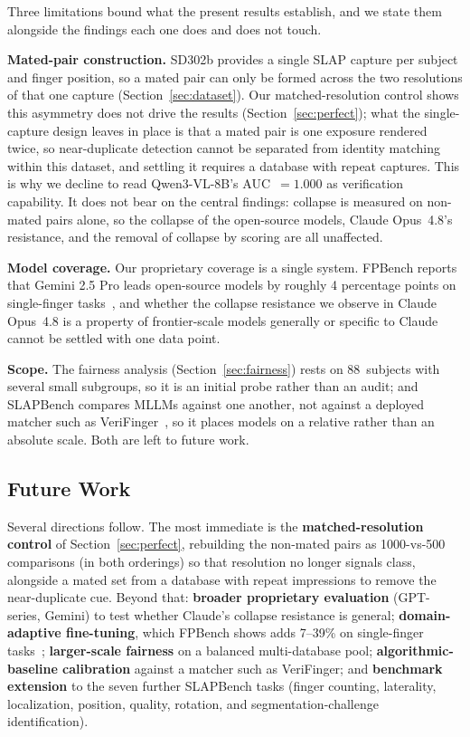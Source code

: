 \documentclass[runningheads]{llncs}
\begin{document}
Three limitations bound what the present results establish, and we state
them alongside the findings each one does and does not touch.

\textbf{Mated-pair construction.}
SD302b provides a single SLAP capture per subject and finger position, so a
mated pair can only be formed across the two resolutions of that one capture
(Section~\ref{sec:dataset}). Our matched-resolution control shows this
asymmetry does not drive the results (Section~\ref{sec:perfect}); what the
single-capture design leaves in place is that a mated pair is one exposure
rendered twice, so near-duplicate detection cannot be separated from identity
matching within this dataset, and settling it requires a database with repeat
captures. This is why we decline to read Qwen3-VL-8B's AUC~$= 1.000$ as
verification capability. It does not bear on the central findings: collapse is
measured on non-mated pairs alone, so the collapse of the open-source models,
Claude Opus~4.8's resistance, and the removal of collapse by scoring are all
unaffected.

\textbf{Model coverage.}
Our proprietary coverage is a single system. FPBench reports that Gemini
2.5 Pro leads open-source models by roughly 4 percentage points on
single-finger tasks~\cite{fpbench2025}, and whether the collapse resistance
we observe in Claude Opus~4.8 is a property of frontier-scale models
generally or specific to Claude cannot be settled with one data point.

\textbf{Scope.} The fairness analysis (Section~\ref{sec:fairness}) rests on
88~subjects with several small subgroups, so it is an initial probe rather than
an audit; and SLAPBench compares MLLMs against one another, not against a
deployed matcher such as VeriFinger~\cite{verifinger}, so it places models on a
relative rather than an absolute scale. Both are left to future work.

\subsection{Future Work}

Several directions follow. The most immediate is the
\textbf{matched-resolution control} of Section~\ref{sec:perfect}, rebuilding
the non-mated pairs as 1000-vs-500 comparisons (in both orderings) so that
resolution no longer signals class, alongside a mated set from a database with
repeat impressions to remove the near-duplicate cue. Beyond that:
\textbf{broader proprietary
evaluation} (GPT-series, Gemini) to test whether Claude's collapse resistance
is general; \textbf{domain-adaptive fine-tuning}, which FPBench shows adds
7--39\% on single-finger tasks~\cite{fpbench2025}; \textbf{larger-scale
fairness} on a balanced multi-database pool; \textbf{algorithmic-baseline
calibration} against a matcher such as VeriFinger; and \textbf{benchmark
extension} to the seven further SLAPBench tasks (finger counting, laterality,
localization, position, quality, rotation, and segmentation-challenge
identification).
\end{document}
